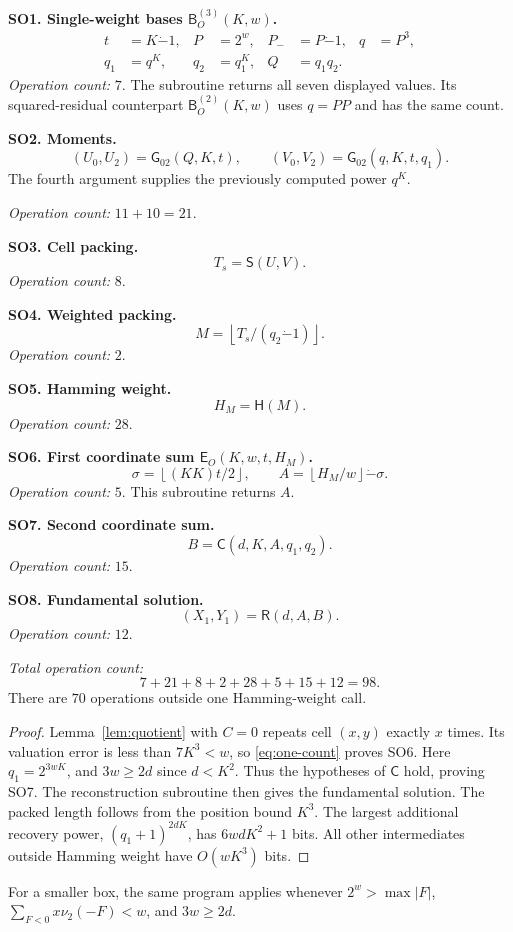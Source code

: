 \documentclass[11pt]{article}
\theoremstyle{remark}
\newcommand{\tsub}{\mathbin{\dot{-}}}
\newcommand{\fl}[1]{\left\lfloor #1\right\rfloor}
\newcommand{\Gpair}{\mathsf{G}_{02}}
\newcommand{\Recover}{\mathsf{R}}
\newcommand{\Coord}{\mathsf{C}}
\newcommand{\Signed}{\mathsf{S}}
\begin{document}
\textbf{SO1. Single-weight bases $\mathsf B_O^{(3)}(K,w)$.}
\begin{align*}
  t&=K\tsub1,& P&=2^w,& P_-&=P\tsub1,& q&=P^3,\\
  q_1&=q^K,& q_2&=q_1^K,& Q&=q_1q_2.&&
\end{align*}
\emph{Operation count:} $7$.
The subroutine returns all seven displayed values. Its squared-residual counterpart
$\mathsf B_O^{(2)}(K,w)$ uses $q=PP$ and has the same count.

\textbf{SO2. Moments.}
\[
  (U_0,U_2)=\Gpair(Q,K,t),\qquad
  (V_0,V_2)=\Gpair(q,K,t,q_1).
\]
The fourth argument supplies the previously computed power $q^K$.

\emph{Operation count:} $11+10=21$.

\textbf{SO3. Cell packing.}
\[
  T_s=\Signed(U,V).
\]
\emph{Operation count:} $8$.

\textbf{SO4. Weighted packing.}
\[
  M=\fl{T_s/(q_2\tsub1)}.
\]
\emph{Operation count:} $2$.

\textbf{SO5. Hamming weight.}
\[
  H_M=\mathsf H(M).
\]
\emph{Operation count:} $28$.

\textbf{SO6. First coordinate sum $\mathsf E_O(K,w,t,H_M)$.}
\[
  \sigma=\fl{(KK)t/2},\qquad A=\fl{H_M/w}\tsub\sigma.
\]
\emph{Operation count:} $5$.
This subroutine returns $A$.

\textbf{SO7. Second coordinate sum.}
\[
  B=\Coord(d,K,A,q_1,q_2).
\]
\emph{Operation count:} $15$.

\textbf{SO8. Fundamental solution.}
\[
  (X_1,Y_1)=\Recover(d,A,B).
\]
\emph{Operation count:} $12$.

\emph{Total operation count:}
\[
  7+21+8+2+28+5+15+12=98.
\]
There are $70$ operations outside one Hamming-weight call.

\begin{proof}
Lemma~\ref{lem:quotient} with $C=0$ repeats cell $(x,y)$ exactly
$x$ times. Its valuation error is less than $7K^3<w$, so
\eqref{eq:one-count} proves SO6.
Here $q_1=2^{3wK}$, and $3w\ge2d$ since $d<K^2$.
Thus the hypotheses of $\Coord$ hold, proving SO7.
The reconstruction subroutine then gives the fundamental solution.
The packed length follows from the position bound $K^3$.
The largest additional recovery power, $(q_1+1)^{2dK}$, has
$6wdK^2+1$ bits. All other intermediates outside Hamming weight
have $O(wK^3)$ bits.
\end{proof}

For a smaller box, the same program applies whenever
$2^w>\max|F|$, $\sum_{F<0}x\nu_2(-F)<w$, and $3w\ge2d$.
\end{document}
